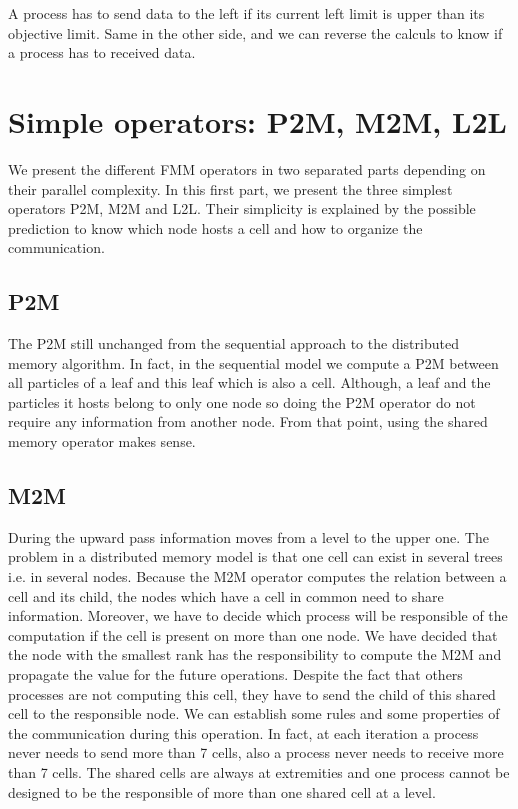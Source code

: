\documentclass[12pt,letterpaper,titlepage]{report}
\begin{document}
A process has to send data to the left if its current left limit is upper than its objective limit.
Same in the other side, and we can reverse the calculs to know if a process has to received data.

\chapter{Simple operators: P2M, M2M, L2L}
We present the different FMM operators in two separated parts depending on their parallel complexity.
In this first part, we present the three simplest operators P2M, M2M and L2L.
Their simplicity is explained by the possible prediction to know which node hosts a cell and how to organize the communication.

\section{P2M}
The P2M still unchanged from the sequential approach to the distributed memory algorithm.
In fact, in the sequential model we compute a P2M between all particles of a leaf and this leaf which is also a cell.
Although, a leaf and the particles it hosts belong to only one node so doing the P2M operator do not require any information from another node.
From that point, using the shared memory operator makes sense.

\section{M2M}
During the upward pass information moves from a level to the upper one.
The problem in a distributed memory model is that one cell can exist in several trees i.e. in several nodes.
Because the M2M operator computes the relation between a cell and its child, the nodes which have a cell in common need to share information.
Moreover, we have to decide which process will be responsible of the computation if the cell is present on more than one node.
We have decided that the node with the smallest rank has the responsibility to compute the M2M and propagate the value for the future operations.
Despite the fact that others processes are not computing this cell, they have to send the child of this shared cell to the responsible node.
We can establish some rules and some properties of the communication during this operation.
In fact, at each iteration a process never needs to send more than 7 cells, also a process never needs to receive more than 7 cells.
The shared cells are always at extremities and one process cannot be designed to be the responsible of more than one shared cell at a level.
\end{document}
